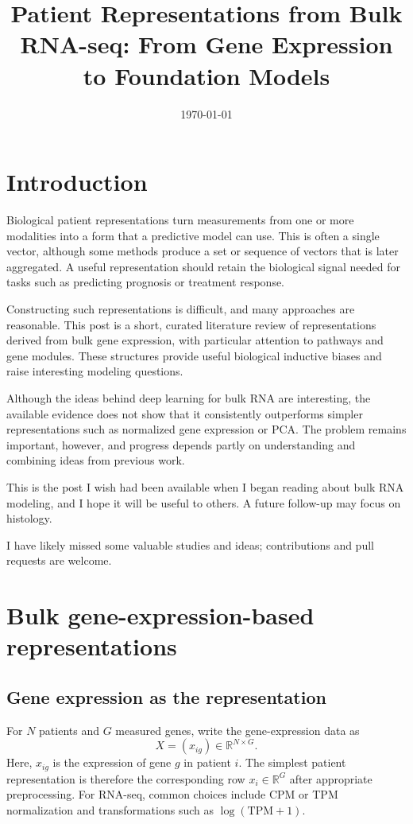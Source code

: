 \documentclass[11pt]{article}
\title{Patient Representations from Bulk RNA-seq:
From Gene Expression to Foundation Models}
\date{\today}
\begin{document}
\maketitle
\begingroup
\setlength{\parskip}{0pt}
\tableofcontents
\endgroup

\section{Introduction}

Biological patient representations turn measurements from one or more
modalities into a form that a predictive model can use. This is often a single
vector, although some methods produce a set or sequence of vectors that is
later aggregated. A useful representation should retain the biological signal
needed for tasks such as predicting prognosis or treatment response.

Constructing such representations is difficult, and many approaches are
reasonable. This post is a short, curated literature review of representations
derived from bulk gene expression, with particular attention to pathways and
gene modules. These structures provide useful biological inductive biases and
raise interesting modeling questions.

Although the ideas behind deep learning for bulk RNA are interesting, the
available evidence does not show that it consistently outperforms simpler
representations such as normalized gene expression or PCA. The problem remains
important, however, and progress depends partly on understanding and combining
ideas from previous work.

This is the post I wish had been available when I began reading about bulk RNA
modeling, and I hope it will be useful to others. A future follow-up may focus
on histology.

I have likely missed some valuable studies and ideas; contributions and pull
requests are welcome.

\section{Bulk gene-expression-based representations}

\subsection{Gene expression as the representation}

For $N$ patients and $G$ measured genes, write the gene-expression data as
\begin{equation}
    X = (x_{ig}) \in \mathbb{R}^{N \times G}.
\end{equation}
Here, $x_{ig}$ is the expression of gene $g$ in patient $i$. The simplest
patient representation is therefore the corresponding row $x_i\in
\mathbb{R}^{G}$ after appropriate preprocessing. For RNA-seq, common choices
include CPM or TPM normalization and transformations such as
$\log(\mathrm{TPM}+1)$.
\end{document}

